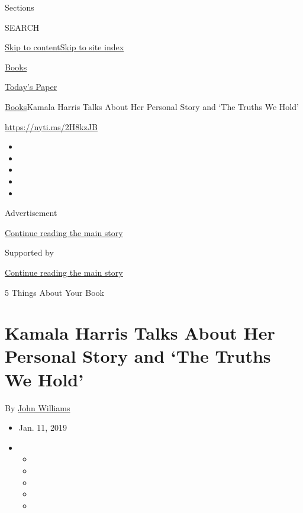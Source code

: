 Sections

SEARCH

\protect\hyperlink{site-content}{Skip to
content}\protect\hyperlink{site-index}{Skip to site index}

\href{https://www.nytimes3xbfgragh.onion/section/books}{Books}

\href{https://myaccount.nytimes3xbfgragh.onion/auth/login?response_type=cookie\&client_id=vi}{}

\href{https://www.nytimes3xbfgragh.onion/section/todayspaper}{Today's
Paper}

\href{/section/books}{Books}\textbar{}Kamala Harris Talks About Her
Personal Story and `The Truths We Hold'

\url{https://nyti.ms/2H8kzJB}

\begin{itemize}
\item
\item
\item
\item
\item
\end{itemize}

Advertisement

\protect\hyperlink{after-top}{Continue reading the main story}

Supported by

\protect\hyperlink{after-sponsor}{Continue reading the main story}

5 Things About Your Book

\hypertarget{kamala-harris-talks-about-her-personal-story-and-the-truths-we-hold}{%
\section{Kamala Harris Talks About Her Personal Story and `The Truths We
Hold'}\label{kamala-harris-talks-about-her-personal-story-and-the-truths-we-hold}}

By \href{https://www.nytimes3xbfgragh.onion/by/john-williams}{John
Williams}

\begin{itemize}
\item
  Jan. 11, 2019
\item
  \begin{itemize}
  \item
  \item
  \item
  \item
  \item
  \end{itemize}
\end{itemize}

